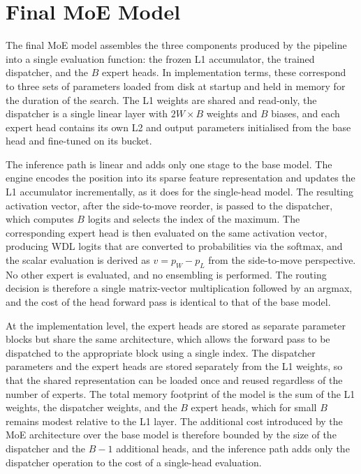 \section{Final MoE Model}

The final MoE model assembles the three components produced by the pipeline into a single evaluation function: the frozen L1 accumulator, the trained dispatcher, and the $B$ expert heads. In implementation terms, these correspond to three sets of parameters loaded from disk at startup and held in memory for the duration of the search. The L1 weights are shared and read-only, the dispatcher is a single linear layer with $2W \times B$ weights and $B$ biases, and each expert head contains its own L2 and output parameters initialised from the base head and fine-tuned on its bucket.

The inference path is linear and adds only one stage to the base model. The engine encodes the position into its sparse feature representation and updates the L1 accumulator incrementally, as it does for the single-head model. The resulting activation vector, after the side-to-move reorder, is passed to the dispatcher, which computes $B$ logits and selects the index of the maximum. The corresponding expert head is then evaluated on the same activation vector, producing WDL logits that are converted to probabilities via the softmax, and the scalar evaluation is derived as $v = p_W - p_L$ from the side-to-move perspective. No other expert is evaluated, and no ensembling is performed. The routing decision is therefore a single matrix-vector multiplication followed by an argmax, and the cost of the head forward pass is identical to that of the base model.

At the implementation level, the expert heads are stored as separate parameter blocks but share the same architecture, which allows the forward pass to be dispatched to the appropriate block using a single index. The dispatcher parameters and the expert heads are stored separately from the L1 weights, so that the shared representation can be loaded once and reused regardless of the number of experts. The total memory footprint of the model is the sum of the L1 weights, the dispatcher weights, and the $B$ expert heads, which for small $B$ remains modest relative to the L1 layer. The additional cost introduced by the MoE architecture over the base model is therefore bounded by the size of the dispatcher and the $B-1$ additional heads, and the inference path adds only the dispatcher operation to the cost of a single-head evaluation.

